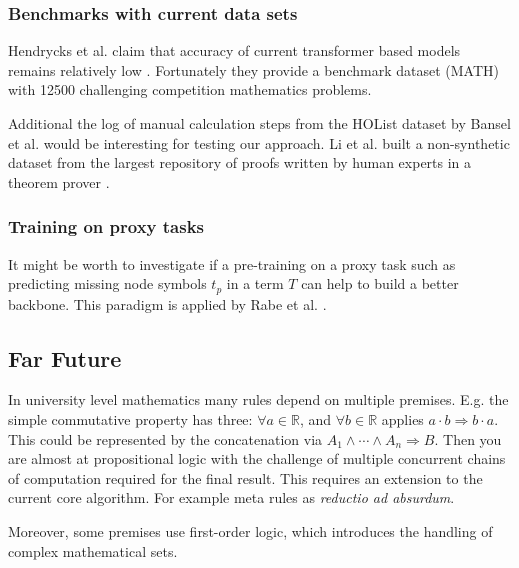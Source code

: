 \documentclass{scrartcl}
\theoremstyle{definition}
\begin{document}
\subsubsection{Benchmarks with current data sets}

Hendrycks et al. claim that accuracy of current transformer based models remains relatively low \cite{hendrycks2021measuring}.
Fortunately they provide a benchmark dataset (MATH) with 12500 challenging competition mathematics problems.

Additional the log of manual calculation steps from the HOList dataset by Bansel et al. \cite{kaliszyk2017holstep} would be interesting for testing our approach.
Li et al. built a non-synthetic dataset from the largest repository of proofs written by human experts in a theorem prover \cite{li2021isarstep}.

\subsubsection{Training on proxy tasks}

It might be worth to investigate if a pre-training on a proxy task such as predicting missing node symbols $t_p$ in a term $T$ can help to build a better backbone.
This paradigm is applied by Rabe et al. \cite{rabe2020mathematical}.

\subsection{Far Future}

In university level mathematics many rules depend on multiple premises.
E.g. the simple commutative property has three: $\forall a \in \mathbb{R}$, and $\forall b \in \mathbb{R}$ applies $a\cdot b \Longrightarrow b\cdot a$.
This could be represented by the concatenation via $A_1 \wedge \cdots \wedge A_n \Longrightarrow B$.
Then you are almost at propositional logic with the challenge of multiple concurrent chains of computation required for the final result.
This requires an extension to the current core algorithm. For example meta rules as \textit{reductio ad absurdum}.

Moreover, some premises use first-order logic, which introduces the handling of complex mathematical sets.


\printbibliography
\end{document}
